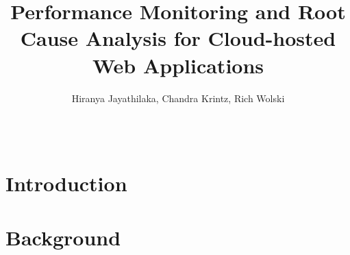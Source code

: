 \documentclass{sig-alternate-05-2015}
\begin{document}






%

\title{Performance Monitoring and Root Cause Analysis for Cloud-hosted Web Applications}
\author{
%
\alignauthor
Hiranya Jayathilaka, Chandra Krintz, Rich Wolski\\
       \\
       \\
}
\maketitle
\begin{abstract}

\end{abstract}

%
%
\printccsdesc



\section{Introduction}


\section{Background}
\label{sec:background}

\end{document}
